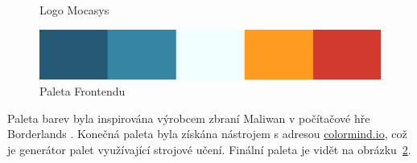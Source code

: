 \begin{figure} \centering
    \def\svgwidth{\columnwidth}
    
\caption{Logo Mocasys}
\label{logoMocasys}
\end{figure}

\begin{figure} \centering
    \includegraphics[width=145mm]{../img/maliwan}
\caption{Paleta Frontendu}
\label{colorScheme}
\end{figure}

Paleta barev byla inspirována výrobcem zbraní Maliwan v počítačové hře Borderlands \citep[viz][]{Maliwan}.
Konečná paleta byla získána nástrojem s adresou \href{https://colormind.io}{colormind.io}, což je generátor palet
využívající strojové učení. Finální paleta je vidět na obrázku~\ref{colorScheme}.
